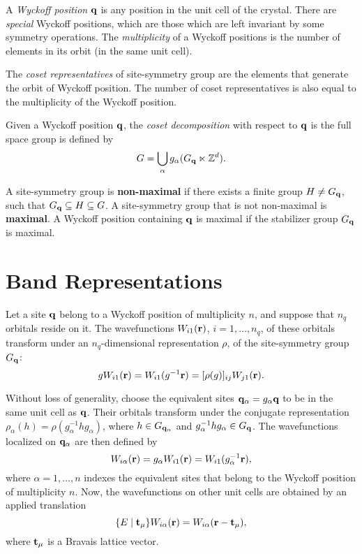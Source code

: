 \begin{definition} \label{def:wyckpos}
A \textit{Wyckoff position} ${\vb{q}}$ is any position in the unit cell of the crystal. There are \textit{special} Wyckoff positions, which are those which are left invariant by some symmetry operations. The \textit{multiplicity} of a Wyckoff positions is the number of elements in its orbit (in the same unit cell).
\end{definition}

\begin{definition} \label{def:cosetrep}
The \textit{coset representatives} of site-symmetry group are the elements that generate the orbit of Wyckoff position. The number of coset representatives is also equal to the multiplicity of the Wyckoff position.
\end{definition}

\begin{definition} \label{def:cosetdecomp}
Given a Wyckoff position ${\vb{q}}$, the \textit{coset decomposition} with respect to ${\vb{q}}$ is the full space group is defined by
$$
G = \bigcup_\alpha g_\alpha (G_{{\vb{q}}} \ltimes {\mathbb{Z}}^d).
$$
\end{definition}

\begin{definition}
A site-symmetry group is \textbf{non-maximal} if there exists a finite group $H \neq G_{\vb{q}}$, such that $G_{\vb{q}} \subseteq H \subseteq G$. A site-symmetry group that is not non-maximal is \textbf{maximal}. A Wyckoff position containing ${\vb{q}}$ is maximal if the stabilizer group $G_{\vb{q}}$ is maximal.
\end{definition}

\section{Band Representations}

Let a site ${\vb{q}}$ belong to a Wyckoff position of multiplicity $n$, and suppose that $n_q$ orbitals reside on it. The wavefunctions $W_{i1}({\vb{r}})$, $i = 1, \ldots, n_q$, of these orbitals transform under an $n_q$-dimensional representation $\rho$, of the site-symmetry group $G_{\vb{q}}$:
$$
g W_{i1}({\vb{r}}) = W_{i1}(g^{-1} {\vb{r}}) = [\rho(g)]_{ij} W_{j1}({\vb{r}}).
$$

Without loss of generality, choose the equivalent sites ${\vb{q}}_\alpha = g_{\alpha} {\vb{q}}$ to be in the same unit cell as ${\vb{q}}$. Their orbitals transform under the conjugate representation $\rho_\alpha(h) = \rho(g_\alpha^{-1} h g_\alpha)$, where $h \in G_{{\vb{q}}_\alpha}$ and $g_\alpha^{-1} h g_\alpha \in G_{\vb{q}}$. The wavefunctions localized on ${\vb{q}}_\alpha$ are then defined by
$$
W_{i\alpha}({\vb{r}}) = g_\alpha W_{i1}({\vb{r}}) = W_{i1}(g_\alpha^{-1} {\vb{r}}),
$$
where $\alpha = 1, \ldots, n$ indexes the equivalent sites that belong to the Wyckoff position of multiplicity $n$. Now, the wavefunctions on other unit cells are obtained by an applied translation
$$
\{ E \mid {\vb{t}}_\mu \} W_{i\alpha}({\vb{r}}) = W_{i\alpha}({\vb{r}}-{\vb{t}}_\mu),
$$
where ${\vb{t}}_\mu$ is a Bravais lattice vector.

